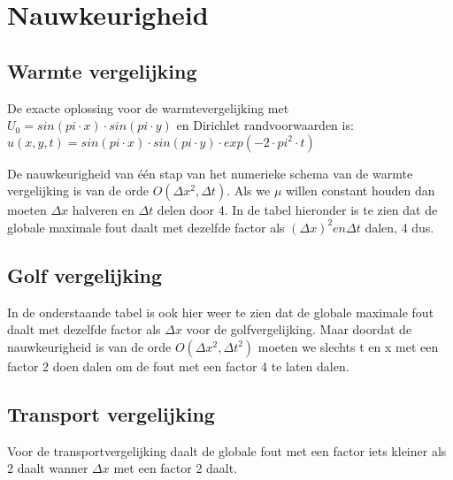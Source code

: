 \documentclass[11pt]{article} %
\begin{document}
\section{Nauwkeurigheid}


	\subsection{Warmte vergelijking}
De exacte oplossing voor de warmtevergelijking met $U_0=sin(pi\cdot x)\cdot sin(pi \cdot y)$ en Dirichlet randvoorwaarden is: $u(x,y,t)= sin(pi\cdot x)\cdot sin(pi\cdot y)\cdot exp(-2\cdot pi^2\cdot t) $ 
	
	De nauwkeurigheid van één stap van het numerieke schema van de warmte vergelijking is van de orde $O(\Delta x^2 , \Delta t) $. Als we $\mu$ willen constant houden dan moeten $\Delta x $ halveren en $ \Delta t$ delen door 4. In de tabel hieronder is te zien dat de globale maximale fout daalt met dezelfde factor als $(\Delta x)^2 en \Delta t$ dalen, 4 dus.  
	
		\begin{center}
			
		\end{center}
	
	
	\subsection{Golf vergelijking}
In de onderstaande tabel is ook hier weer te zien dat de globale maximale fout daalt met dezelfde factor als $\Delta x$ voor de golfvergelijking. Maar doordat de nauwkeurigheid is van de orde $O(\Delta x^2 , \Delta t^2)$ moeten we slechts t en x met een factor 2 doen dalen om de fout met een factor 4 te laten dalen.
		\begin{center}
			
		\end{center}
	\subsection{Transport vergelijking}
Voor de transportvergelijking daalt de globale fout met een factor iets kleiner als 2 daalt wanner $\Delta x$ met een factor 2 daalt. 
		\begin{center}
			
		\end{center}
	
\end{document}
